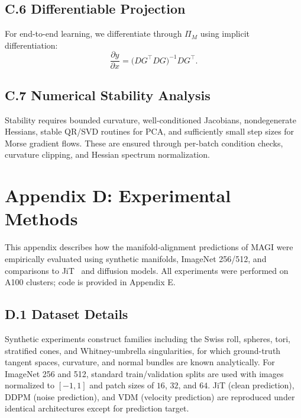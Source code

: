 \documentclass[11pt,a4paper,twocolumn]{article}
\begin{document}
\subsection*{C.6 Differentiable Projection}

For end-to-end learning, we differentiate through $\Pi_M$ using
implicit differentiation:
\[
\frac{\partial y}{\partial x}
=
\big(DG^\top DG\big)^{-1} DG^\top.
\]

\subsection*{C.7 Numerical Stability Analysis}

Stability requires bounded curvature, well-conditioned Jacobians,
nondegenerate Hessians, stable QR/SVD routines for PCA, and
sufficiently small step sizes for Morse gradient flows. These are
ensured through per-batch condition checks, curvature clipping, and
Hessian spectrum normalization.


\section*{Appendix D: Experimental Methods}

This appendix describes how the manifold-alignment predictions of MAGI
were empirically evaluated using synthetic manifolds, ImageNet 256/512,
and comparisons to JiT~\cite{li2025backtobasics} and diffusion models.
All experiments were performed on A100 clusters; code is provided in
Appendix E.

\subsection*{D.1 Dataset Details}

Synthetic experiments construct families including the Swiss roll,
spheres, tori, stratified cones, and Whitney-umbrella singularities,
for which ground-truth tangent spaces, curvature, and normal bundles are
known analytically. For ImageNet 256 and 512, standard train/validation
splits are used with images normalized to $[-1,1]$ and patch sizes of
$16$, $32$, and $64$. JiT (clean prediction), DDPM (noise prediction),
and VDM (velocity prediction) are reproduced under identical
architectures except for prediction target.
\end{document}
